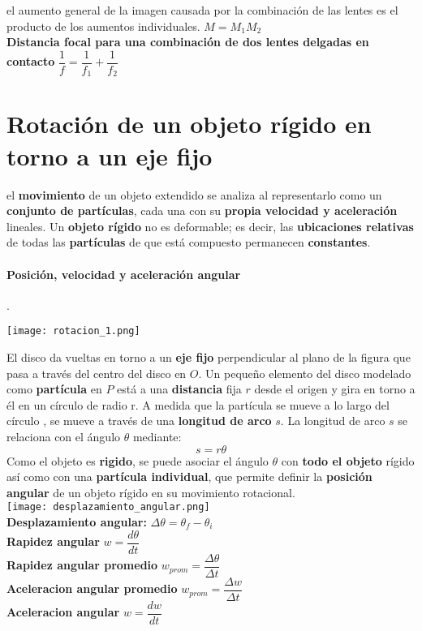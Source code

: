 \documentclass[10pt]{article}
\begin{document}
el aumento general de la imagen causada por la combinación de las lentes es el producto de los aumentos individuales. $M = M_1 M_2$\\
\linebreak
\textbf{Distancia focal para una combinación de dos lentes delgadas en contacto} $\dfrac{1}{f} = \dfrac{1}{f_1} + \dfrac{1}{f_2}$

\section{ Rotación de un objeto rígido en torno a un eje fijo}

el \textbf{movimiento} de un objeto extendido se analiza al representarlo como un \textbf{conjunto de partículas}, cada una con su \textbf{propia velocidad y aceleración} lineales. Un \textbf{objeto rígido} no es deformable; es decir, las \textbf{ubicaciones relativas} de todas las \textbf{partículas} de que está compuesto permanecen \textbf{constantes}.\\
\pagebreak

\paragraph{Posición, velocidad y aceleración angular}.

\texttt{[image: rotacion\_1.png]}

El disco da vueltas en torno a un \textbf{eje fijo} perpendicular al plano de la figura que pasa a través del centro del disco en $O$. Un pequeño elemento del disco modelado como \textbf{partícula} en $P$ está a una \textbf{distancia} fija $r$ desde el origen y gira en torno a él en un círculo de radio r.  A medida que la partícula se mueve a lo largo del círculo , se mueve a través de una \textbf{longitud de arco} $s$. La longitud de arco $s$ se relaciona con el ángulo $\theta$ mediante: 
\begin{equation*}
	s = r\theta
\end{equation*}
Como el objeto es \textbf{rigido},  se puede asociar el ángulo $\theta$ con \textbf{todo el objeto} rígido así como con una \textbf{partícula individual}, que permite definir la \textbf{posición angular} de un objeto rígido en su movimiento rotacional.\\
\linebreak
\texttt{[image: desplazamiento\_angular.png]}\\
\textbf{Desplazamiento angular: } $\Delta \theta = \theta_f - \theta_i$\\
\linebreak
\textbf{Rapidez angular} $w = \dfrac{d\theta}{dt}$\\
\linebreak
\textbf{Rapidez angular promedio} $w_{prom} = \dfrac{\Delta \theta}{\Delta t}$\\
\linebreak
\textbf{Aceleracion angular promedio} $w_{prom} = \dfrac{\Delta w}{\Delta t}$\\
\linebreak
\textbf{Aceleracion angular} $w = \dfrac{dw}{dt}$\\
\linebreak
\end{document}
